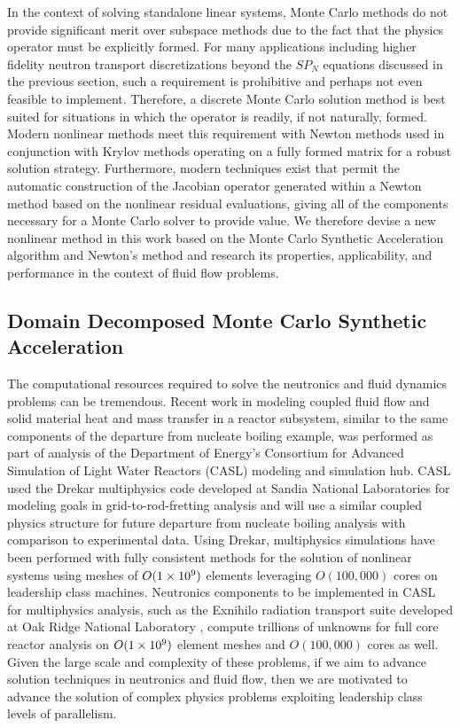 In the context of solving standalone linear systems, Monte Carlo
methods do not provide significant merit over subspace methods due to
the fact that the physics operator must be explicitly formed. For many
applications including higher fidelity neutron transport
discretizations beyond the $SP_N$ equations discussed in the previous
section, such a requirement is prohibitive and perhaps not even
feasible to implement. Therefore, a discrete Monte Carlo solution
method is best suited for situations in which the operator is readily,
if not naturally, formed. Modern nonlinear methods meet this
requirement with Newton methods used in conjunction with Krylov
methods operating on a fully formed matrix for a robust solution
strategy. Furthermore, modern techniques exist that permit the
automatic construction of the Jacobian operator generated within a
Newton method based on the nonlinear residual evaluations, giving all
of the components necessary for a Monte Carlo solver to provide
value. We therefore devise a new nonlinear method in this work based
on the Monte Carlo Synthetic Acceleration algorithm and Newton's
method and research its properties, applicability, and performance in
the context of fluid flow problems.

\subsection{Domain Decomposed Monte Carlo Synthetic Acceleration}
\label{subsec:parallel_motivation}

The computational resources required to solve the neutronics and fluid
dynamics problems can be tremendous. Recent work in modeling coupled
fluid flow and solid material heat and mass transfer in a reactor
subsystem, similar to the same components of the departure from
nucleate boiling example, was performed as part of analysis of the
Department of Energy's Consortium for Advanced Simulation of Light
Water Reactors (CASL) modeling and simulation hub. CASL used the
Drekar multiphysics code developed at Sandia National Laboratories
\cite{pawlowski_drekar_2012} for modeling goals in
grid-to-rod-fretting analysis and will use a similar coupled physics
structure for future departure from nucleate boiling analysis with
comparison to experimental data. Using Drekar, multiphysics
simulations have been performed with fully consistent methods for the
solution of nonlinear systems using meshes of $O(1\times 10^{9})$ elements
leveraging $O(100,000)$ cores on leadership class machines. Neutronics
components to be implemented in CASL for multiphysics analysis, such
as the Exnihilo radiation transport suite developed at Oak Ridge
National Laboratory \cite{evans_denovo:_2010}, compute trillions of
unknowns for full core reactor analysis on $O(1\times 10^{9})$ element
meshes and $O(100,000)$ cores as well. Given the large scale and
complexity of these problems, if we aim to advance solution techniques
in neutronics and fluid flow, then we are motivated to advance the
solution of complex physics problems exploiting leadership class
levels of parallelism.

